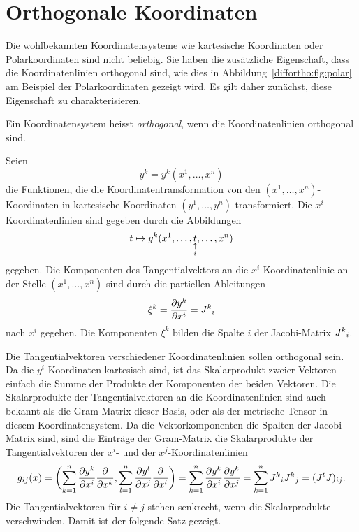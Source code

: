 %
%
%
%
\section{Orthogonale Koordinaten\label{diffortho:section:orthokoord}}
%
Die wohlbekannten Koordinatensysteme wie kartesische Koordinaten oder
Polarkoordinaten sind nicht beliebig.
Sie haben die zusätzliche Eigenschaft, dass die Koordinatenlinien
orthogonal sind, wie dies in Abbildung~\ref{diffortho:fig:polar}
am Beispiel der Polarkoordinaten gezeigt wird.
Es gilt daher zunächst, diese Eigenschaft zu charakterisieren.

\begin{definition}
Ein Koordinatensystem heisst {\em orthogonal}, wenn die Koordinatenlinien
orthogonal sind.
%
%
\end{definition}

Seien 
\[
y^k
=
y^k(x^1,\dots,x^n)
\]
die Funktionen, die die Koordinatentransformation von den
$(x^1,\dots,x^n)$-Koordinaten in kartesische Koordinaten
$(y^1,\dots,y^n)$ transformiert.
Die $x^i$-Koordinatenlinien sind gegeben durch die Abbildungen
\[
t \mapsto y^k(x^1,\dots,\underset{\clap{$\uparrow\atop i$}}{t},\dots,x^n)
\]
gegeben.
Die Komponenten des Tangentialvektors an die $x^i$-Koordinatenlinie
an der Stelle $(x^1,\dots,x^n)$ sind durch die partiellen Ableitungen
\[
\xi^k
=
\frac{\partial y^k}{\partial x^i}
=
J^k\mathstrut_i
\]
nach $x^i$ gegeben.
Die Komponenten $\xi^k$ bilden die Spalte $i$ der Jacobi-Matrix
$J^k\mathstrut_i$.
%

Die Tangentialvektoren verschiedener Koordinatenlinien sollen orthogonal
sein.
Da die $y^i$-Koordinaten kartesisch sind, ist das Skalarprodukt zweier
Vektoren einfach die Summe der Produkte der Komponenten der beiden Vektoren.
Die Skalarprodukte der Tangentialvektoren an die Koordinatenlinien sind
auch bekannt als die Gram-Matrix dieser Basis, oder als der metrische
Tensor in diesem Koordinatensystem.
%
%
%
Da die Vektorkomponenten die Spalten der Jacobi-Matrix sind, sind die
Einträge der Gram-Matrix die Skalarprodukte der Tangentialvektoren der
$x^i$- und der $x^j$-Koordinatenlinien
\[
g_{ij}(x)
=
\biggl(
\sum_{k=1}^n
\frac{\partial y^k}{\partial x^i}
\frac{\partial}{\partial x^k}
,
\sum_{l=1}^n
\frac{\partial y^l}{\partial x^j}
\frac{\partial}{\partial x^l}
\biggr)
=
\sum_{k=1}^n
\frac{\partial y^k}{\partial x^i}
\frac{\partial y^k}{\partial x^j}
=
\sum_{k=1}^n
J^k\mathstrut_i
J^k\mathstrut_j
=
(J^tJ)_{ij}.
\]
Die Tangentialvektoren für $i\ne j$ stehen senkrecht, wenn die
Skalarprodukte verschwinden.
Damit ist der folgende Satz gezeigt.

